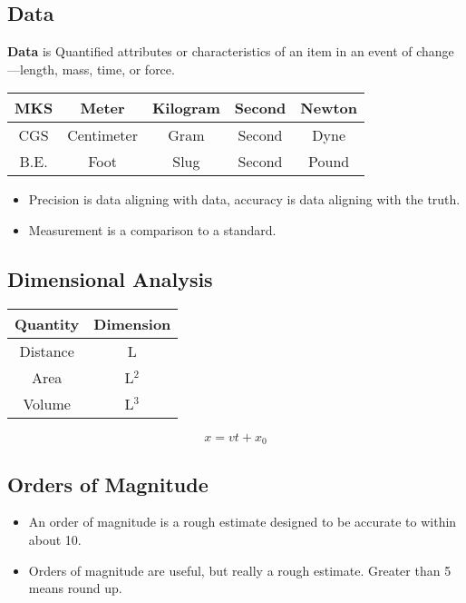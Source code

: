 \documentclass[11pt]{article}
\begin{document}
\subsection{Data}
	{\bf Data} is Quantified attributes or characteristics of an item in an event
	of change---length, mass, time, or force.

	\begin{center}
	\begin{tabular}{||| c || c | c | c | c |||}
		\hline \hline
		MKS		& Meter				& Kilogram	        & Second		& Newton \\
		\hline \hline
		CGS 	        & Centimeter	                & Gram			& Second		& Dyne	 \\
		\hline \hline
		B.E.	        & Foot				& Slug			& Second		& Pound	 \\
		\hline \hline
	\end{tabular}
	\end{center}

	\begin{itemize}
		\item Precision is data aligning with data, accuracy is data aligning with 
			the truth.
		\item Measurement is a comparison to a standard.
	\end{itemize}
\subsection{Dimensional Analysis}
\begin{tabular}{||| c || c |||}
	\hline \hline
	Quantity                        & Dimension \\
	\hline \hline
	Distance 			& L \\
	\hline \hline
	Area 			        & L$^2$ \\
	\hline \hline
	Volume 				& L$^3$ \\
	\hline \hline
\end{tabular}
\[ x = vt + x_{0} \]
\subsection{Orders of Magnitude}
    \begin{itemize}
     \item An order of magnitude is a rough estimate designed to be accurate to within
       about 10.
     \item Orders of magnitude are useful, but really a rough estimate.  Greater than
       5 means round up.
    \end{itemize}
\end{document}
